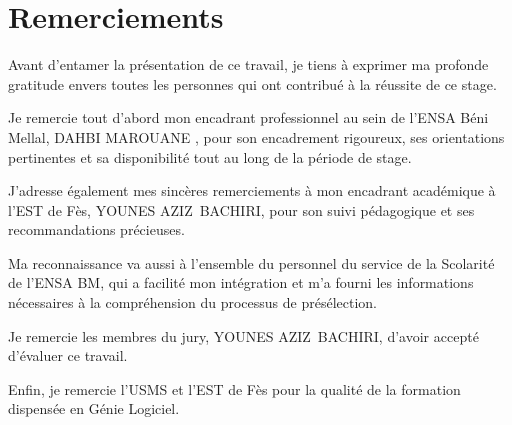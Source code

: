 \chapter*{Remerciements}

Avant d'entamer la présentation de ce travail, je tiens à exprimer ma profonde gratitude envers toutes les personnes qui ont contribué à la réussite de ce stage.

Je remercie tout d'abord mon encadrant professionnel au sein de l'ENSA Béni Mellal, DAHBI MAROUANE , pour son encadrement rigoureux, ses orientations pertinentes et sa disponibilité tout au long de la période de stage.

J'adresse également mes sincères remerciements à mon encadrant académique à l'EST de Fès, YOUNES AZIZ BACHIRI, pour son suivi pédagogique et ses recommandations précieuses.

Ma reconnaissance va aussi à l'ensemble du personnel du service de la Scolarité de l'ENSA BM, qui a facilité mon intégration et m'a fourni les informations nécessaires à la compréhension du processus de présélection.

Je remercie les membres du jury, YOUNES AZIZ BACHIRI, d'avoir accepté d'évaluer ce travail.

Enfin, je remercie l'USMS et l'EST de Fès pour la qualité de la formation dispensée en Génie Logiciel.

